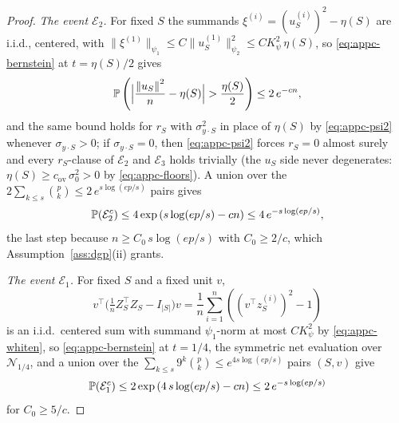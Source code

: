 \begin{proof}
{\emph{The event $\mathcal E_2$.} For fixed $S$ the summands
$\xi^{(i)} = ( u_S^{(i)} )^2 - \eta(S)$ are i.i.d., centered, with
$\| \xi^{(1)} \|_{\psi_1} \le C \| u_S^{(1)} \|_{\psi_2}^2
\le C K_\psi^2\, \eta(S)$, so \eqref{eq:appc-bernstein} at
$t = \eta(S)/2$ gives
\begin{equation}\label{eq:appc-E2-single}
        \mathbb{P}\left( \Big| \frac{\left\lVert u_S \right\rVert^2}{n} - \eta(S) \Big|
        > \frac{\eta(S)}{2} \right)
        \le 2\, e^{-c n},
\end{equation}
and the same bound holds for $r_S$ with $\sigma_{y \cdot S}^2$ in
place of $\eta(S)$ by \eqref{eq:appc-psi2} whenever
$\sigma_{y \cdot S} > 0$; if $\sigma_{y \cdot S} = 0$, then
\eqref{eq:appc-psi2} forces $r_S = 0$ almost surely and every
$r_S$-clause of $\mathcal E_2$ and $\mathcal E_3$ holds trivially
(the $u_S$ side never degenerates:
$\eta(S) \ge c_{\mathrm{ov}}\, \sigma_0^2 > 0$ by
\eqref{eq:appc-floors}). A union over the
$2 \sum_{k \le s} \binom{p}{k} \le 2\, e^{s \log(ep/s)}$ pairs gives
\begin{equation}\label{eq:appc-E2-union}
        \mathbb{P}( \mathcal E_2^c )
        \le 4 \exp\left( s \log(ep/s) - c n \right)
        \le 4\, e^{- s \log(ep/s)},
\end{equation}
the last step because $n \ge C_0\, s \log(ep/s)$ with
$C_0 \ge 2/c$, which Assumption~\ref{ass:dgp}(ii) grants.

\emph{The event $\mathcal E_1$.} For fixed $S$ and a fixed unit $v$,
\begin{equation}\label{eq:appc-E1-form}
        v^\top \Big( \tfrac1n Z_S^\top Z_S - I_{|S|} \Big) v
        =
        \frac1n \sum_{i=1}^n
        \left( ( v^\top z_S^{(i)} )^2 - 1 \right)
\end{equation}
is an i.i.d.\ centered sum with summand $\psi_1$-norm at most
$C K_\psi^2$ by \eqref{eq:appc-whiten}, so
\eqref{eq:appc-bernstein} at $t = 1/4$, the symmetric net evaluation
over $\mathcal N_{1/4}$, and a union over the
$\sum_{k \le s} 9^{k} \binom{p}{k} \le e^{4 s \log(ep/s)}$ pairs
$(S, v)$ give
\begin{equation}\label{eq:appc-E1-union}
        \mathbb{P}( \mathcal E_1^c )
        \le 2 \exp\left( 4\, s \log(ep/s) - c n \right)
        \le 2\, e^{- s \log(ep/s)}
\end{equation}
for $C_0 \ge 5/c$.

}
\end{proof}
